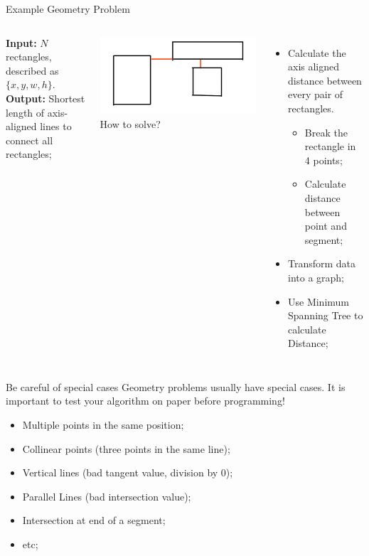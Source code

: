 \begin{frame}[t]{Example Geometry Problem}

  \begin{columns}
  \begin{block}{}
    {\bf Input:} $N$ rectangles, described as $\{x, y, w, h\}$.\\
    {\bf Output:} Shortest length of axis-aligned lines to connect all rectangles;
  \end{block}

  \includegraphics[width=1\textwidth]{img/sampleproblem_2.png}
  How to solve?
  \begin{itemize}
    \item Calculate the axis aligned distance between every pair of rectangles.
    \begin{itemize}
      \item Break the rectangle in 4 points;
      \item Calculate distance between point and segment;
    \end{itemize}
    \item Transform data into a graph;
    \item Use Minimum Spanning Tree to calculate Distance;
  \end{itemize}
\end{columns}
\end{frame}

\begin{frame}{Be careful of special cases}
  Geometry problems usually have special cases. It is important to test your
  algorithm on paper before programming!\bigskip

  \begin{itemize}
    \item Multiple points in the same position;
    \item Collinear points (three points in the same line);
    \item Vertical lines (bad tangent value, division by 0);
    \item Parallel Lines (bad intersection value);
    \item Intersection at end of a segment;
    \item etc;
  \end{itemize}
\end{frame}

